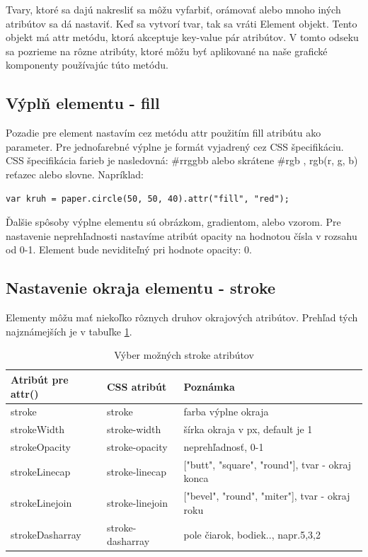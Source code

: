 Tvary, ktoré sa dajú nakresliť sa môžu vyfarbiť, orámovať alebo mnoho iných atribútov sa dá nastaviť. Keď sa vytvorí tvar, tak sa vráti Element objekt. Tento objekt má attr metódu, ktorá akceptuje key-value pár atribútov. V tomto odseku sa pozrieme na rôzne atribúty, ktoré môžu byť aplikované na naše grafické komponenty používajúc túto metódu. 

\subsection{Výplň elementu - fill }

Pozadie pre element nastavím cez metódu attr použitím fill atribútu ako parameter. Pre jednofarebné výplne je formát vyjadrený cez CSS špecifikáciu. CSS špecifikácia farieb je nasledovná: \#rrggbb alebo skrátene \#rgb , rgb(r, g, b) reťazec alebo slovne. 
Napríklad: 
\begin{lstlisting}
var kruh = paper.circle(50, 50, 40).attr("fill", "red");
\end{lstlisting}

Ďalšie spôsoby výplne elementu sú obrázkom,  gradientom, alebo vzorom. 
Pre nastavenie neprehľadnosti nastavíme atribút opacity na hodnotou čísla v rozsahu od 0-1. Element bude neviditeľný pri hodnote opacity: 0. 
 

\subsection{Nastavenie okraja elementu - stroke}

Elementy môžu mať niekoľko rôznych druhov okrajových atribútov. Prehľad tých najznámejších je v tabuľke \ref{parametre:styl}.\cite{styly}


\begin{table}[H]
	\begin{center}
		
		\begin{tabular}{|l|l|l|}
			\hline \textbf{Atribút pre attr() } &\textbf{CSS atribút} & \textbf{Poznámka} \\  \hline 			
			\hline stroke & stroke & farba výplne okraja \\ 
			\hline strokeWidth & stroke-width & šírka okraja v px, default je 1 \\ 
			\hline strokeOpacity & stroke-opacity & neprehľadnosť, 0-1 \\
			\hline strokeLinecap & stroke-linecap & ["butt", "square", "round"], tvar - okraj konca\\ 
			\hline strokeLinejoin & stroke-linejoin & ["bevel", "round", "miter"], tvar - okraj roku\\ 
			\hline strokeDasharray &stroke-dasharray & pole čiarok, bodiek.., napr.5,3,2\\
			\hline
		\end{tabular} 
	\end{center}
	\caption{Výber možných stroke atribútov}
	\label{parametre:styl}
\end{table}


